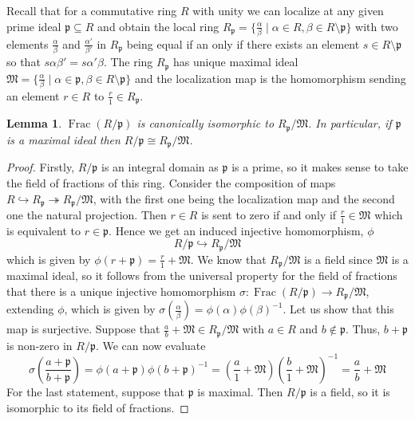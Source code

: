 \documentclass{article}
\DeclareMathOperator{\Frac}{Frac}
\newtheorem{lemma}{Lemma}[section]
\newcommand{\mfrak}[1]{\mathfrak{#1}}
\begin{document}

Recall that for a commutative ring $R$ with unity we can localize at any given prime ideal $\mfrak p \subseteq R$ and obtain the local ring $R_\mfrak p = \{\frac{\alpha}{\beta} \mid \alpha \in R, \beta \in R \setminus \mfrak p \}$ with two elements $\frac{\alpha}{\beta}$ and  $\frac{\alpha'}{\beta'}$ in $R_\mfrak p$ being equal if an only if there exists an element $s \in R \setminus \mfrak p$ so that $s\alpha \beta' = s\alpha' \beta$. The ring $R_\mfrak p$ has unique maximal ideal $\mfrak M =  \{\frac{\alpha}{\beta} \mid \alpha \in \mfrak p, \beta \in R\setminus \mfrak p \}$ and the localization map is the homomorphism sending an element $r \in R$ to $\frac{r}{1} \in R_\mfrak p$.  

\begin{lemma} \label{lem: Canonical localization isomorphism}
    $\Frac(R / \mfrak p)$ is canonically isomorphic to $R_\mfrak p / \mfrak M$. In particular, if $\mfrak p$ is a maximal ideal then $R / \mfrak p \cong R_\mfrak p / \mfrak M$.
\end{lemma}
\begin{proof}
    Firstly, $R / \mfrak p$ is an integral domain as $\mfrak p$ is a prime, so it makes sense to take the field of fractions of this ring. Consider the composition of maps $R \hookrightarrow R_\mfrak p \twoheadrightarrow R_\mfrak p / \mfrak M$, with the first one being the localization map and the second one the natural projection. Then $r \in R$ is sent to zero if and only if $\frac{r}{1} \in \mfrak M$ which is equivalent to $r \in \mfrak p$. Hence we get an induced injective homomorphism, $\phi$
    $$R / \mfrak p \hookrightarrow R_\mfrak p / \mfrak M$$
    which is given by $\phi(r + \mfrak p) = \frac{r}{1} + \mfrak M$. We know that $R_\mfrak p / \mfrak M$ is a field since $\mfrak M$ is a maximal ideal, so it follows from the universal property for the field of fractions that there is a unique injective homomorphism $\sigma : \Frac(R / \mfrak p) \to R_\mfrak p / \mfrak M$, extending $\phi$, which is given by $\sigma(\frac{\alpha}{\beta}) = \phi(\alpha)\phi(\beta)^{-1}$. Let us show that this map is surjective. Suppose that $\frac{a}{b} + \mfrak M  \in R_\mfrak p / \mfrak M$ with $a \in R$ and $b \notin \mfrak p$. Thus, $b + \mfrak p$ is non-zero in $R / \mfrak p$. We can now evaluate 
    $$\sigma(\frac{a + \mfrak p}{b + \mfrak p}) = \phi(a + \mfrak p)\phi(b + \mfrak p)^{-1} = (\frac{a}{1} + \mfrak M) (\frac{b}{1} + \mfrak M)^{-1} = \frac{a}{b} + \mfrak M$$ 
    For the last statement, suppose that $\mfrak p$ is maximal. Then $R / \mfrak p$ is a field, so it is isomorphic to its field of fractions. 
\end{proof}
\end{document}
